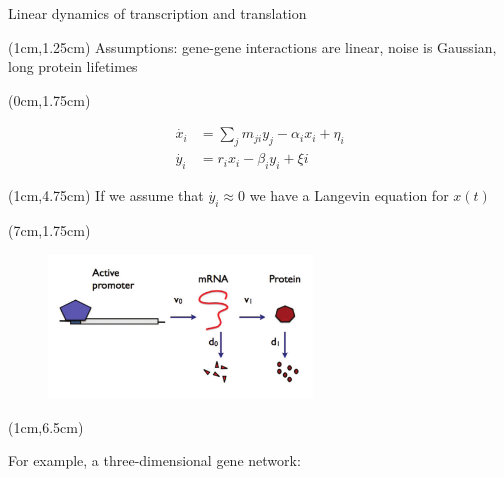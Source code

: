 \documentclass[aspectratio=1610]{beamer}					%
\begin{document}
\begin{frame}{Linear dynamics of transcription and translation}

\begin{textblock*}{15cm}(1cm,1.25cm)
Assumptions: gene-gene interactions are linear, noise is Gaussian, long protein lifetimes
\end{textblock*}

\begin{textblock*}{7cm}(0cm,1.75cm)
\begin{figure}
\begin{align*}
\dot{x_{i}} &= \sum_{j}m_{ji}y_{j} - \alpha_{i}x_{i} + \eta_{i}\\
\dot{y_{i}} &= r_{i}x_{i} - \beta_{i}y_{i} + \xi{i}
\end{align*}
\end{figure}
\end{textblock*}

\begin{textblock*}{7cm}(1cm,4.75cm)
If we assume that $\dot{y_{i}} \approx 0$ we have a Langevin equation for $x(t)$
\end{textblock*}

\begin{textblock*}{7cm}(7cm,1.75cm)
\begin{figure}
\includegraphics[width=7cm]{linear.png}
\end{figure}
\end{textblock*}

\begin{textblock*}{15cm}(1cm,6.5cm)

For example, a three-dimensional gene network:


\end{textblock*}
\end{frame}
\end{document}
